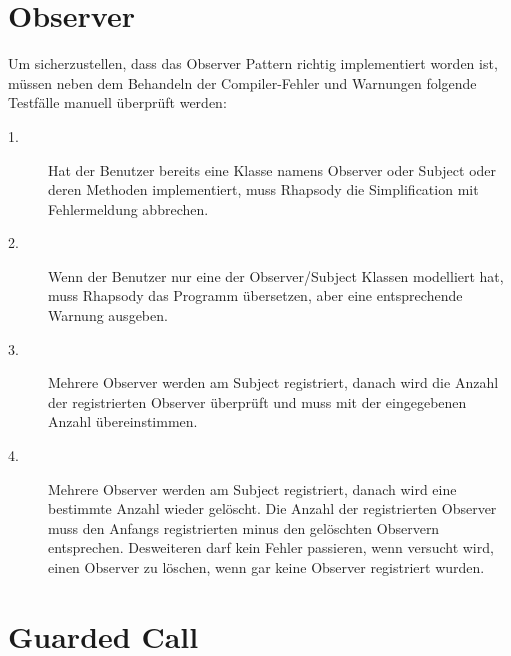 \section{Observer}

Um sicherzustellen, dass das Observer Pattern richtig implementiert worden ist, müssen neben dem Behandeln der Compiler-Fehler und Warnungen folgende Testfälle manuell überprüft werden: 

\begin{description}

	\item[1.]
	Hat der Benutzer bereits eine Klasse namens Observer oder Subject oder deren Methoden implementiert, muss Rhapsody die Simplification mit Fehlermeldung abbrechen.
	
	\item[2.]
	Wenn der Benutzer nur eine der Observer/Subject Klassen modelliert hat, muss Rhapsody das Programm übersetzen, aber eine entsprechende Warnung ausgeben.
	
	\item[3.]
	Mehrere Observer werden am Subject registriert, danach wird die Anzahl der registrierten Observer überprüft und muss mit der eingegebenen Anzahl übereinstimmen.

	\item[4.]
	Mehrere Observer werden am Subject registriert, danach wird eine bestimmte Anzahl wieder gelöscht. Die Anzahl der registrierten Observer muss den Anfangs registrierten minus den gelöschten Observern entsprechen. Desweiteren darf kein Fehler passieren, wenn versucht wird, einen Observer zu löschen, wenn gar keine Observer registriert wurden.

\end{description}


\section{Guarded Call}

